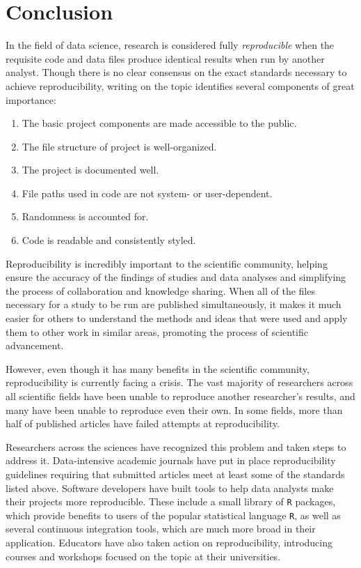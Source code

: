\documentclass[12pt,twoside]{reedthesis}
\begin{document}
\hypertarget{conclusion}{%
\chapter*{Conclusion}\label{conclusion}}

In the field of data science, research is considered fully \emph{reproducible} when the requisite code and data files produce identical results when run by another analyst. Though there is no clear consensus on the exact standards necessary to achieve reproducibility, writing on the topic identifies several components of great importance:
\begin{enumerate}
\def\labelenumi{\arabic{enumi}.}
\item
  The basic project components are made accessible to the public.
\item
  The file structure of project is well-organized.
\item
  The project is documented well.
\item
  File paths used in code are not system- or user-dependent.
\item
  Randomness is accounted for.
\item
  Code is readable and consistently styled.
\end{enumerate}
Reproducibility is incredibly important to the scientific community, helping ensure the accuracy of the findings of studies and data analyses and simplifying the process of collaboration and knowledge sharing. When all of the files necessary for a study to be run are published simultaneously, it makes it much easier for others to understand the methods and ideas that were used and apply them to other work in similar areas, promoting the process of scientific advancement.

However, even though it has many benefits in the scientific community, reproducibility is currently facing a crisis. The vast majority of researchers across all scientific fields have been unable to reproduce another researcher's results, and many have been unable to reproduce even their own. In some fields, more than half of published articles have failed attempts at reproducibility.

Researchers across the sciences have recognized this problem and taken steps to address it.
Data-intensive academic journals have put in place reproducibility guidelines requiring that submitted articles meet at least some of the standards listed above. Software developers have built tools to help data analysts make their projects more reproducible. These include a small library of \texttt{R} packages, which provide benefits to users of the popular statistical language \texttt{R}, as well as several continuous integration tools, which are much more broad in their application. Educators have also taken action on reproducibility, introducing courses and workshops focused on the topic at their universities.
\end{document}

